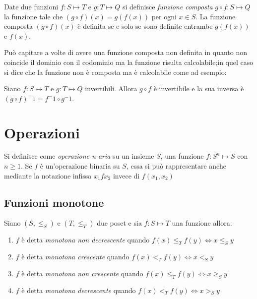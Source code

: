 Date due funzioni $f:S \mapsto T$ e $g:T \mapsto Q$ si definisce \emph{funzione composta}
$g \circ f:S \mapsto Q$ la funzione tale che $(g \circ f)(x) = g(f(x))$ per ogni $x \in S$.
La funzione composta $(g \circ f)(x)$ è definita se e solo se sono definite entrambe
$g(f(x))$ e $f(x)$.


Può capitare a volte di avere una funzione composta non definita in quanto non coincide
il dominio con il codominio ma la funzione risulta calcolabile;in quel caso si dice
che la funzione non è composta ma è calcolabile come ad esempio:


\begin{thm}
Siano $f:S \mapsto T$ e $g:T \mapsto Q$ invertibili. Allora $g \circ f$ è invertibile
e la sua inversa è $(g \circ f) ^ -1 = f^-1 \circ g ^ -1$.
\end{thm}

\section{Operazioni}
Si definisce come \emph{operazione n-aria} su un insieme $S$, una funzione
$f:S^n \mapsto S$ con $n \geq 1$.
Se $f$ è un'operazione binaria su $S$, essa si può rappresentare anche mediante
la notazione infissa $x_1 f x_2$ invece di $f(x_1,x_2)$


\subsection{Funzioni monotone}
\begin{defi}
    Siano $(S,\leq _S)$ e $(T,\leq _T)$ due poset e sia $f:S \mapsto T$ una funzione allora:
\end{defi}
\begin{enumerate}
    \item $f$ è detta \emph{monotona non decrescente} quando $f(x) \leq_T f(y) \iff x \leq_S y$
    \item $f$ è detta \emph{monotona crescente} quando $f(x) <_T f(y) \iff x <_S y$
    \item $f$ è detta \emph{monotona non crescente} quando $f(x) \leq_T f(y) \iff x \geq_S y$
    \item $f$ è detta \emph{monotona decrescente} quando $f(x) <_T f(y) \iff x >_S y$
\end{enumerate}
